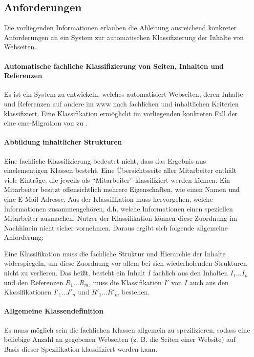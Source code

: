     \subsection{Anforderungen}
        \label{section:requirements}
        Die vorliegenden Informationen erlauben
        die Ableitung ausreichend konkreter Anforderungen an ein System
        zur automatischen Klassifizierung der Inhalte von Webseiten.

        \paragraph*{Automatische fachliche Klassifizierung von Seiten, Inhalten und Referenzen}
        Es ist ein System zu entwickeln, welches automatisiert Webseiten,
        deren Inhalte und Referenzen auf andere {\resources} im \gls{www}
        nach fachlichen und inhaltlichen Kriterien klassifiziert.
        Eine Klassifikation ermöglicht im vorliegenden konkreten Fall
        der {\fernUni} eine \gls{cms}-Migration von {\wordpress} zu {\imperia}.

        \paragraph*{Abbildung inhaltlicher Strukturen}
        Eine fachliche Klassifizierung bedeutet nicht,
        dass das Ergebnis aus einelementigen Klassen besteht.
        Eine Übersichtsseite aller Mitarbeiter enthält viele Einträge,
        die jeweils als "`Mitarbeiter"' klassifiziert werden können.
        Ein Mitarbeiter besitzt offensichtlich mehrere Eigenschaften,
        wie einen Namen und eine E-Mail-Adresse.
        Aus der Klassifikation muss hervorgehen,
        welche Informationen zusammengehören,
        d.h. welche Informationen einen speziellen Mitarbeiter ausmachen.
        Nutzer der Klassifikation können diese Zuordnung im Nachhinein nicht sicher vornehmen.
        Daraus ergibt sich folgende allgemeine Anforderung:

        Eine Klassifikation muss die fachliche Struktur
        und Hierarchie der Inhalte widerspiegeln,
        um diese Zuordnung vor allem bei sich wiederholenden Strukturen
        nicht zu verlieren.
        Das heißt, besteht ein Inhalt $I$ fachlich aus den Inhalten $I_1 \ldots I_n$
        und den Referenzen $R_1 \ldots R_m$,
        muss die Klassifikation $I'$ von $I$ auch aus den Klassifikationen
        $I'_1 \ldots I'_n$ und $R'_1 \ldots R'_m$ bestehen.

        \paragraph*{Allgemeine Klassendefinition}
        Es muss möglich sein die fachlichen Klassen allgemein zu
        spezifizieren, sodass eine beliebige Anzahl an gegebenen
        Webseiten (z. B. die Seiten einer Website)
        auf Basis dieser Spezifikation klassifiziert werden kann.

